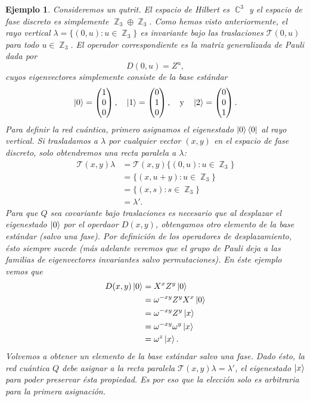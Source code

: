 \documentclass[a4paper]{report}
\DeclareMathOperator{\C}{\mathbb{C}}
\DeclareMathOperator{\Z}{\mathbb{Z}}
\newtheorem{example}{Ejemplo}
\begin{document}
  \begin{example}
    Consideremos un qutrit. El espacio de Hilbert es
    $\C^{3}$ y el espacio de fase discreto es simplemente
    $\Z_3 \oplus \Z_3$. Como hemos visto anteriormente, el
    rayo vertical $\lambda = \{(0,u) : u \in \Z_3\}$ es
    invariante bajo las traslaciones $\mathcal T(0,u)$ para
    todo $u \in \Z_3$. El operador correspondiente es la
    matriz generalizada de Pauli dada por
    \[
      D(0,u) = Z^{u},
    \] 
    cuyos eigenvectores simplemente consiste de la base
    estándar
    \[
      \ket 0 = \begin{pmatrix} 1\\0\\0 \end{pmatrix},
      \quad
      \ket 1 = \begin{pmatrix} 0\\1\\0 \end{pmatrix},
      \quad \text{y} \quad
      \ket 2 = \begin{pmatrix} 0\\0\\1 \end{pmatrix}.
    \] 
    Para definir la red cuántica, primero asignamos el
    eigenestado $\ket 0 \bra 0$ al rayo vertical. Si
    trasladamos a $\lambda$ por \textit{cualquier} vector
    $(x,y)$ en el espacio de fase discreto, solo obtendremos
    una recta paralela a $\lambda$:
    \begin{align}
      \mathcal T(x,y) \lambda
      &= \mathcal T(x,y) \{(0,u) : u \in \Z_3\} \\
      &= \{(x,u+y) : u \in \Z_3\} \\
      &= \{(x,s) : s \in \Z_3\} \\
      &= \lambda'.
    \end{align}
    Para que $Q$ sea covariante bajo traslaciones es
    necesario que al desplazar el eigenestado $\ket 0$ por
    el operdaor $D(x,y)$, obtengamos otro elemento de la
    base estándar (salvo una fase). Por definición de los
    operadores de desplazamiento, ésto siempre sucede (más
    adelante veremos que el grupo de Pauli deja a las
    familias de eigenvectores invariantes salvo
    permutaciones). En éste ejemplo vemos que
    \begin{align}
      D(x,y) \ket 0
      &= X^{x} Z^{y} \ket 0 \\
      &= \omega^{-xy} Z^{y} X^{x} \ket 0 \\
      &= \omega^{-xy} Z^{y} \ket x \\
      &= \omega^{-xy} \omega^{y} \ket x \\
      &= \omega^{z} \ket x.
    \end{align}
    Volvemos a obtener un elemento de la base estándar salvo
    una fase. Dado ésto, la red cuántica $Q$ debe asignar a
    la recta paralela $\mathcal T(x,y) \lambda = \lambda'$,
    el eigenestado $\ket x$ para poder preservar ésta
    propiedad. Es por eso que la elección solo es arbitraria
    para la primera asignación.
  \end{example}
\end{document}
